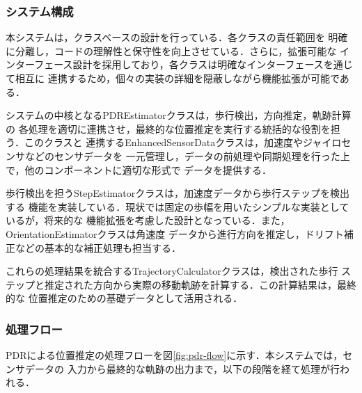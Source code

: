 \subsubsection{システム構成}

本システムは，クラスベースの設計を行っている．各クラスの責任範囲を
明確に分離し，コードの理解性と保守性を向上させている．さらに，拡張可能な
インターフェース設計を採用しており，各クラスは明確なインターフェースを通じて相互に
連携するため，個々の実装の詳細を隠蔽しながら機能拡張が可能である．

システムの中核となるPDREstimatorクラスは，歩行検出，方向推定，軌跡計算の
各処理を適切に連携させ，最終的な位置推定を実行する統括的な役割を担う．このクラスと
連携するEnhancedSensorDataクラスは，加速度やジャイロセンサなどのセンサデータを
一元管理し，データの前処理や同期処理を行った上で，他のコンポーネントに適切な形式で
データを提供する．

歩行検出を担うStepEstimatorクラスは，加速度データから歩行ステップを検出する
機能を実装している．現状では固定の歩幅を用いたシンプルな実装としているが，将来的な
機能拡張を考慮した設計となっている．また，OrientationEstimatorクラスは角速度
データから進行方向を推定し，ドリフト補正などの基本的な補正処理も担当する．

これらの処理結果を統合するTrajectoryCalculatorクラスは，検出された歩行
ステップと推定された方向から実際の移動軌跡を計算する．この計算結果は，最終的な
位置推定のための基礎データとして活用される．

\subsubsection{処理フロー}
PDRによる位置推定の処理フローを図\ref{fig:pdr-flow}に示す．本システムでは，センサデータの
入力から最終的な軌跡の出力まで，以下の段階を経て処理が行われる．

